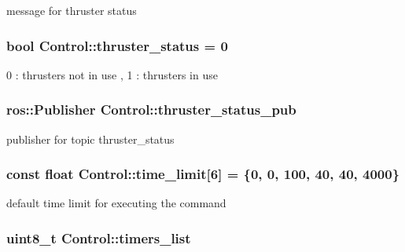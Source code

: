 message for thruster status 

\subsubsection[{\texorpdfstring{thruster\+\_\+status}{thruster_status}}]{\setlength{\rightskip}{0pt plus 5cm}bool Control\+::thruster\+\_\+status = 0\hspace{0.3cm}{\ttfamily [private]}}\hypertarget{classControl_a3de70e43f3432be0d75cff773f325421}{}\label{classControl_a3de70e43f3432be0d75cff773f325421}


0 \+: thrusters not in use , 1 \+: thrusters in use 

\subsubsection[{\texorpdfstring{thruster\+\_\+status\+\_\+pub}{thruster_status_pub}}]{\setlength{\rightskip}{0pt plus 5cm}ros\+::\+Publisher Control\+::thruster\+\_\+status\+\_\+pub\hspace{0.3cm}{\ttfamily [private]}}\hypertarget{classControl_a914384fbf8c6a3e58a485fc91c44d374}{}\label{classControl_a914384fbf8c6a3e58a485fc91c44d374}


publisher for topic thruster\+\_\+status 

\subsubsection[{\texorpdfstring{time\+\_\+limit}{time_limit}}]{\setlength{\rightskip}{0pt plus 5cm}const float Control\+::time\+\_\+limit\mbox{[}6\mbox{]} = \{0, 0, 100, 40, 40, 4000\}\hspace{0.3cm}{\ttfamily [private]}}\hypertarget{classControl_ab6952c55a537ef9c92a874a72d5781b5}{}\label{classControl_ab6952c55a537ef9c92a874a72d5781b5}


default time limit for executing the command 

\subsubsection[{\texorpdfstring{timers\+\_\+list}{timers_list}}]{\setlength{\rightskip}{0pt plus 5cm}uint8\+\_\+t Control\+::timers\+\_\+list\hspace{0.3cm}{\ttfamily [private]}}\hypertarget{classControl_ac06b4442ca2a5141fe6d8637f0f4a169}{}\label{classControl_ac06b4442ca2a5141fe6d8637f0f4a169}


